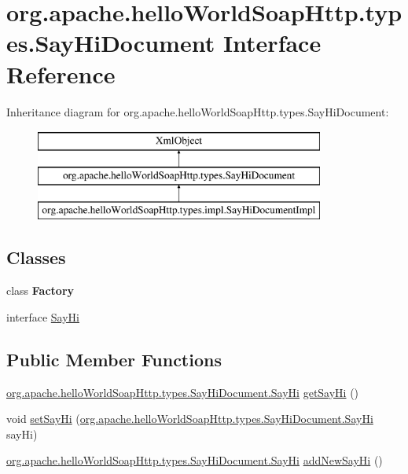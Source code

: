 \hypertarget{interfaceorg_1_1apache_1_1hello_world_soap_http_1_1types_1_1_say_hi_document}{}\section{org.\+apache.\+hello\+World\+Soap\+Http.\+types.\+Say\+Hi\+Document Interface Reference}
\label{interfaceorg_1_1apache_1_1hello_world_soap_http_1_1types_1_1_say_hi_document}
Inheritance diagram for org.\+apache.\+hello\+World\+Soap\+Http.\+types.\+Say\+Hi\+Document\+:\begin{figure}[H]
\begin{center}
\leavevmode
\includegraphics[height=3.000000cm]{interfaceorg_1_1apache_1_1hello_world_soap_http_1_1types_1_1_say_hi_document}
\end{center}
\end{figure}
\subsection*{Classes}
\begin{DoxyCompactItemize}
\item 
class {\bfseries Factory}
\item 
interface \hyperlink{interfaceorg_1_1apache_1_1hello_world_soap_http_1_1types_1_1_say_hi_document_1_1_say_hi}{Say\+Hi}
\end{DoxyCompactItemize}
\subsection*{Public Member Functions}
\begin{DoxyCompactItemize}
\item 
\hyperlink{interfaceorg_1_1apache_1_1hello_world_soap_http_1_1types_1_1_say_hi_document_1_1_say_hi}{org.\+apache.\+hello\+World\+Soap\+Http.\+types.\+Say\+Hi\+Document.\+Say\+Hi} \hyperlink{interfaceorg_1_1apache_1_1hello_world_soap_http_1_1types_1_1_say_hi_document_a4dc346faed16103f7cdb35c6cf2c91d4}{get\+Say\+Hi} ()
\item 
void \hyperlink{interfaceorg_1_1apache_1_1hello_world_soap_http_1_1types_1_1_say_hi_document_af5e74567cac8eb5643c064c87cdada1a}{set\+Say\+Hi} (\hyperlink{interfaceorg_1_1apache_1_1hello_world_soap_http_1_1types_1_1_say_hi_document_1_1_say_hi}{org.\+apache.\+hello\+World\+Soap\+Http.\+types.\+Say\+Hi\+Document.\+Say\+Hi} say\+Hi)
\item 
\hyperlink{interfaceorg_1_1apache_1_1hello_world_soap_http_1_1types_1_1_say_hi_document_1_1_say_hi}{org.\+apache.\+hello\+World\+Soap\+Http.\+types.\+Say\+Hi\+Document.\+Say\+Hi} \hyperlink{interfaceorg_1_1apache_1_1hello_world_soap_http_1_1types_1_1_say_hi_document_a44d27aba201e4ca86b7bdb95c089bce9}{add\+New\+Say\+Hi} ()
\end{DoxyCompactItemize}
